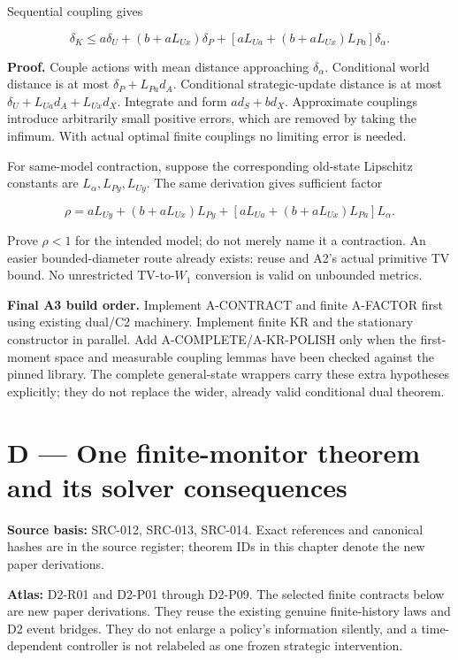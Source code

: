 \documentclass[
  11pt,
  a4paper,
]{article}
\newcommand{\codewrap}[1]{{\ttfamily\seqsplit{#1}}}
\begin{document}
Sequential coupling gives

\[\boxed{\delta_K\le
 a\delta_U+(b+aL_{Ux})\delta_P+
 [aL_{Ua}+(b+aL_{Ux})L_{Pa}]\delta_\alpha.}\]

\textbf{Proof.} Couple actions with mean distance approaching
\(\delta_\alpha\). Conditional world distance is at most
\(\delta_P+L_{Pa}d_A\). Conditional strategic-update distance is at most
\(\delta_U+L_{Ua}d_A+L_{Ux}d_X\). Integrate and form \(a d_S+b d_X\).
Approximate couplings introduce arbitrarily small positive errors, which
are removed by taking the infimum. With actual optimal finite couplings
no limiting error is needed.

For same-model contraction, suppose the corresponding old-state
Lipschitz constants are \(L_\alpha,L_{Py},L_{Uy}\). The same derivation
gives sufficient factor

\[\rho=aL_{Uy}+(b+aL_{Ux})L_{Py}
+[aL_{Ua}+(b+aL_{Ux})L_{Pa}]L_\alpha.\]

Prove \(\rho<1\) for the intended model; do not merely name it a
contraction. An easier bounded-diameter route already exists: reuse
\codewrap{W1DualLE.of\_eventTV} and A2's actual primitive TV bound. No
unrestricted TV-to-\(W_1\) conversion is valid on unbounded metrics.

\textbf{Final A3 build order.} Implement A-CONTRACT and finite A-FACTOR
first using existing dual/C2 machinery. Implement finite KR and the
stationary constructor in parallel. Add A-COMPLETE/A-KR-POLISH only when
the first-moment space and measurable coupling lemmas have been checked
against the pinned library. The complete general-state wrappers carry
these extra hypotheses explicitly; they do not replace the wider,
already valid conditional dual theorem.

\newpage

\section{D --- One finite-monitor theorem and its solver
consequences}\label{d-one-finite-monitor-theorem-and-its-solver-consequences}

\textbf{Source basis:} SRC-012, SRC-013, SRC-014. Exact references and
canonical hashes are in the source register; theorem IDs in this chapter
denote the new paper derivations.

\textbf{Atlas:} D2-R01 and D2-P01 through D2-P09. The selected finite
contracts below are new paper derivations. They reuse the existing
genuine finite-history laws and D2 event bridges. They do not enlarge a
policy's information silently, and a time-dependent controller is not
relabeled as one frozen strategic intervention.
\end{document}
